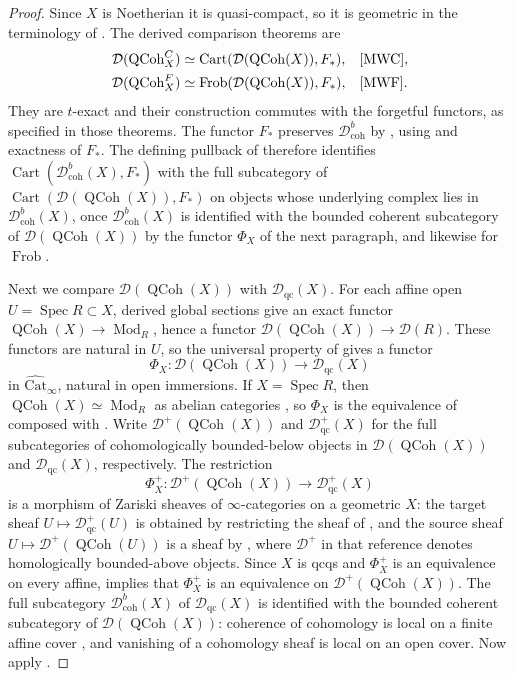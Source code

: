 \documentclass[11pt]{amsart}
\newcommand{\Cart}{\operatorname{Cart}}
\newcommand{\QCoh}{\operatorname{{QCoh}}}
\newcommand{\Spec}{\operatorname{Spec}}
\newcommand{\Catbig}{\widehat{\mathrm{Cat}}}
\newcommand{\Frob}{\operatorname{Frob}}
\newcommand{\Dqc}{\mathcal D_{\mathrm{qc}}}
\newcommand{\Dbc}{\mathcal D^b_{\mathrm{coh}}}
\theoremstyle{plain}
\theoremstyle{definition}
\numberwithin{equation}{section}
\begin{document}
\begin{proof}
Since $X$ is Noetherian it is quasi-compact, so it is geometric in the terminology of \cite[Definition 4.10]{MWF}.
The derived comparison theorems are
\begin{align*}
 \mathcal D(\QCoh^C_X)&\simeq
       \Cart(\mathcal D(\QCoh(X)),F_*),
       &&\text{\cite[Theorem 5.1; Corollary 6.2]{MWC}},\\
 \mathcal D(\QCoh^F_X)&\simeq
       \Frob(\mathcal D(\QCoh(X)),F_*),
       &&\text{\cite[Theorem 5.7]{MWF}}.
\end{align*}
They are $t$-exact and their construction commutes with the forgetful functors, as specified in those theorems.
The functor $F_*$ preserves $\Dbc$ by , using \cite[\href{https://stacks.math.columbia.edu/tag/01Y6}{Tag 01Y6}]{SP} and exactness of $F_*$.
The defining pullback of  therefore identifies $\Cart(\Dbc(X),F_*)$ with the full subcategory of $\Cart(\mathcal D(\QCoh(X)),F_*)$ on objects whose underlying complex lies in $\Dbc(X)$, once $\Dbc(X)$ is identified with the bounded coherent subcategory of $\mathcal D(\QCoh(X))$ by the functor $\Phi_X$ of the next paragraph, and likewise for $\Frob$.

Next we compare $\mathcal D(\QCoh(X))$ with $\Dqc(X)$.
For each affine open $U=\Spec R\subset X$, derived global sections give an exact functor $\QCoh(X)\to\operatorname{Mod}_R$, hence a functor $\mathcal D(\QCoh(X))\to\mathcal D(R)$.
These functors are natural in $U$, so the universal property of  gives a functor
\[
 \Phi_X:\mathcal D(\QCoh(X))\longrightarrow\Dqc(X)
\]
in $\Catbig_\infty$, natural in open immersions.
If $X=\Spec R$, then $\QCoh(X)\simeq\operatorname{Mod}_R$ as abelian categories \cite[\href{https://stacks.math.columbia.edu/tag/01IB}{Tag 01IB}]{SP}, so $\Phi_X$ is the equivalence of  composed with \cite[Theorem 7.1.2.13]{HA}.
Write $\mathcal D^+(\QCoh(X))$ and $\Dqc^+(X)$ for the full subcategories of cohomologically bounded-below objects in $\mathcal D(\QCoh(X))$ and $\Dqc(X)$, respectively.
The restriction
\[
 \Phi_X^+:\mathcal D^+(\QCoh(X))\longrightarrow\Dqc^+(X)
\]
is a morphism of Zariski sheaves of $\infty$-categories on a geometric $X$: the target sheaf $U\mapsto\Dqc^+(U)$ is obtained by restricting the sheaf of , and the source sheaf $U\mapsto\mathcal D^+(\QCoh(U))$ is a sheaf by \cite[Lemma 4.14]{MWF}, where $\mathcal D^+$ in that reference denotes homologically bounded-above objects.
Since $X$ is qcqs and $\Phi_X^+$ is an equivalence on every affine, \cite[Lemma 4.5]{MWF} implies that $\Phi_X^+$ is an equivalence on $\mathcal D^+(\QCoh(X))$.
The full subcategory $\Dbc(X)$ of $\Dqc(X)$ is identified with the bounded coherent subcategory of $\mathcal D(\QCoh(X))$: coherence of cohomology is local on a finite affine cover \cite[\href{https://stacks.math.columbia.edu/tag/01XZ}{Tag 01XZ}]{SP}, and vanishing of a cohomology sheaf is local on an open cover.
Now apply .


\end{proof}
\end{document}
